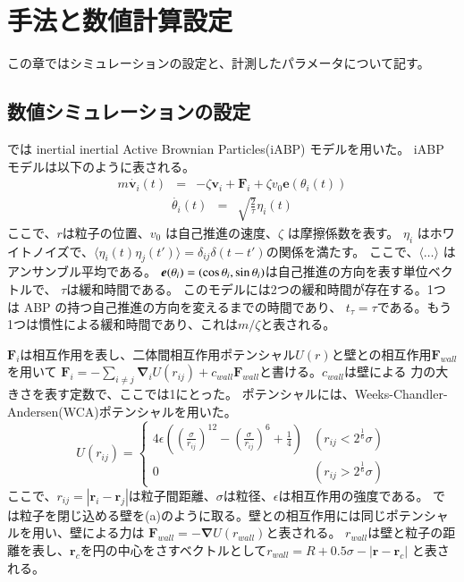 \documentclass[/Users/ikedahajime/GitHub/reserch/master_report/thesis]{subfiles}
\begin{document}
\chapter{手法と数値計算設定}
この章ではシミュレーションの設定と、計測したパラメータについて記す。
\section{数値シミュレーションの設定}
では inertial inertial Active Brownian Particles(iABP) モデルを用いた。
iABP モデルは以下のように表される。
\begin{eqnarray}\label{eq:eom_iabp_1}
    m\dot{\bm{v}_i}(t)&=& - \zeta \bm{v}_i  +\bm{F}_i +\zeta v_0 \bm{e}(\theta_i(t))
\end{eqnarray}
\begin{eqnarray}\label{eq:eom_iabp_2}
    \dot{\theta_i }(t) &=& \sqrt{\frac{2}{\tau}}\eta_i(t)
\end{eqnarray}
ここで、\mbox{\boldmath$r$}は粒子の位置、$v_0$ は自己推進の速度、$\zeta$ は摩擦係数を表す。
$\eta_i$ はホワイトノイズで、$\langle \eta_i(t) \eta_j(t') \rangle=\delta_{ij}\delta(t-t')$の関係を満たす。
ここで、$\langle \dots \rangle$ はアンサンブル平均である。
$\mbox{\boldmath$e$}(\theta_i)=(\cos\theta_i,\sin \theta_i)$は自己推進の方向を表す単位ベクトルで、
$\tau$は緩和時間である。
このモデルには2つの緩和時間が存在する。1つは ABP の持つ自己推進の方向を変えるまでの時間であり、
$t_\tau=\tau$である。もう1つは慣性による緩和時間であり、これは$m/\zeta$と表される。


$\bm{F}_i$は相互作用を表し、二体間相互作用ポテンシャル$U(r)$と壁との相互作用$\bm{F}_{wall}$を用いて
$\bm{F}_i=-\sum_{i\neq j} \bm{\nabla}_iU(r_{ij})+c_{wall}\bm{F}_{wall}$と書ける。$c_{wall}$は壁による
力の大きさを表す定数で、ここでは1にとった。
ポテンシャルには、Weeks-Chandler-Andersen(WCA)ポテンシャル\cite{weeksRoleRepulsiveForces1971}を用いた。
\begin{equation}
    U(r_{ij})=
    \begin{cases}
        4\epsilon\left(\left(\frac{\sigma}{r_{ij}}\right)^{12}-\left(\frac{\sigma}{r_{ij}}\right)^6+\frac{1}{4}\right) & (r_{ij}<2^{\frac{1}{6}}\sigma)\\
        0 &(r_{ij}>2^{\frac{1}{6}}\sigma)
    \end{cases}
\end{equation}
ここで、$r_{ij}=\left|\bm{r}_i-\bm{r}_j\right|$は粒子間距離、$\sigma$は粒径、$\epsilon$は相互作用の強度である。
では粒子を閉じ込める壁を(a)のように取る。壁との相互作用には同じポテンシャルを用い、壁による力は
$\bm{F}_{wall}=-\bm{\nabla}U(r_{wall})$と表される。
$r_{wall}$は壁と粒子の距離を表し、$\bm{r}_c$を円の中心をさすベクトルとして$r_{wall}=R+0.5\sigma-\left|\bm{r}-\bm{r}_c\right|$
と表される。
\end{document}
